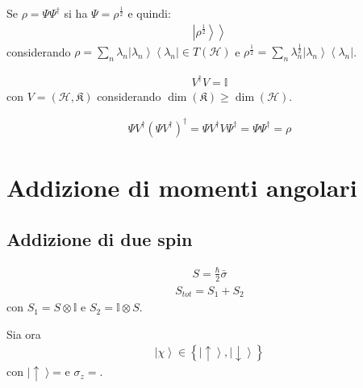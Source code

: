Se $\rho=\Psi\Psi^{\dag}$ si ha $\Psi=\rho^{\frac{1}{2}}$ e quindi:
\begin{equation}\begin{split}
\left.\left |\rho^{\frac{1}{2}} \right\rangle\right\rangle
\end{split}\end{equation}
considerando $\rho=\sum_n{\lambda_n\left |\lambda_n \right\rangle\left\langle \lambda_n\right |}\in T\left(\mathcal{H}\right)$ e $\rho^{\frac{1}{2}}=\sum_n{\lambda_n^{\frac{1}{2}}\left |\lambda_n \right\rangle\left\langle \lambda_n\right |}$.

\begin{equation}\begin{split}
V^{\dag}V=\mathbb{I}
\end{split}\end{equation}
con $V=\left(\mathcal{H},\mathfrak{K}\right)$ considerando $\dim\left(\mathfrak{K}\right)\ge \dim\left(\mathcal{H}\right)$.

\begin{equation}\begin{split}
\Psi V^{\dag}\left(\Psi V^{\dag}\right)^{\dag}=\Psi V^{\dag} V \Psi^{\dag}=\Psi \Psi^{\dag}=\rho
\end{split}\end{equation}

\section{Addizione di momenti angolari} %
\subsection{Addizione di due spin} %
\begin{equation}\begin{split}
S=\frac{\hbar }{2}\bar \sigma
\end{split}\end{equation}
\begin{equation}\begin{split}
S_{tot}=S_1+S_2
\end{split}\end{equation}
con $S_1=S\otimes \mathbb{I}$ e $S_2=\mathbb{I}\otimes S$.

Sia ora
\begin{equation}\begin{split}
\left |\chi \right\rangle\in \left\{\left |\uparrow \right\rangle,\left |\downarrow \right\rangle\right\}
\end{split}\end{equation}
con $\left |\uparrow \right\rangle$= e $\sigma_z=$.

